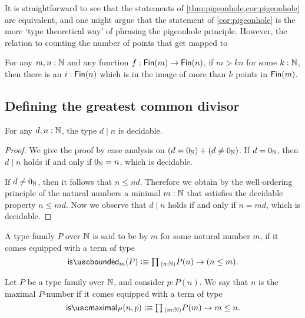 It is straightforward to see that the statements of \cref{thm:pigeonhole,cor:pigeonhole} are equivalent, and one might argue that the statement of \cref{cor:pigeonhole} is the more `type theoretical way' of phrasing the pigeonhole principle. However, the relation to counting the number of points that get mapped to 

\begin{thm}\label{thm:generalized-pigeonhole}
  For any $m,n:{\mathbb{N}}$ and any function $f:\mathsf{Fin}(m)\to\mathsf{Fin}(n)$, if $m>kn$ for some $k:{\mathbb{N}}$, then there is an $i:\mathsf{Fin}(n)$ which is in the image of more than $k$ points in $\mathsf{Fin}(m)$. 
\end{thm}

\subsection{Defining the greatest common divisor}

\begin{lem}
  For any $d,n:{\mathbb{N}}$, the type $d\mid n$ is decidable.
\end{lem}

\begin{proof}
  We give the proof by case analysis on $(d=0_{{\mathbb{N}}})+(d\neq0_{{\mathbb{N}}})$. If $d=0_{{\mathbb{N}}}$, then $d\mid n$ holds if and only if $0_{{\mathbb{N}}}=n$, which is decidable.

  If $d\neq0_{{\mathbb{N}}}$, then it follows that $n\leq nd$. Therefore we obtain by the well-ordering principle of the natural numbers a minimal $m:{\mathbb{N}}$ that satisfies the decidable property $n\leq md$. Now we observe that $d\mid n$ holds if and only if $n=md$, which is decidable.
\end{proof}

\begin{defn}
  A type family $P$ over ${\mathbb{N}}$ is said to be  by $m$ for some natural number $m$, if it comes equipped with a term of type
  \begin{equation*}
    \isbounded_m(P) \defeq \prd{n:\N}P(n)\to (n\leq m).
  \end{equation*}
\end{defn}

\begin{defn}
  Let $P$ be a type family over ${\mathbb{N}}$, and consider $p:P(n)$. We say that $n$ is the maximal $P$-number if it comes equipped with a term of type
  \begin{equation*}
    \ismaximal_P(n,p) \defeq \prd{m:\N} P(m)\to m\leq n.
  \end{equation*}
\end{defn}

